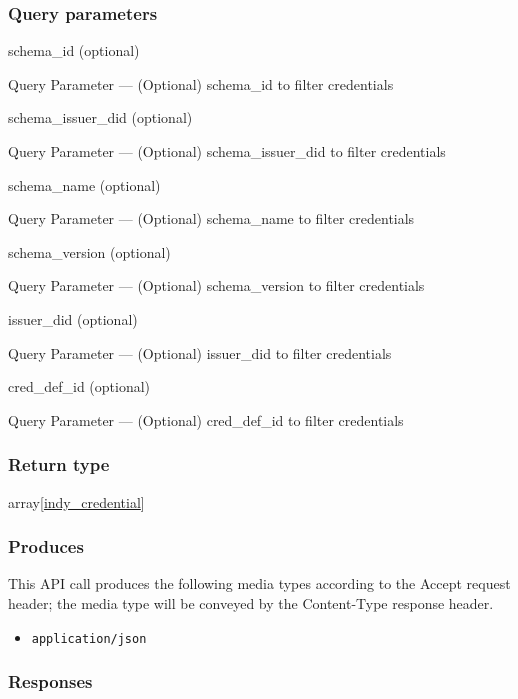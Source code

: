 \hypertarget{query-parameters-4}{%
\subsubsection{Query parameters}\label{query-parameters-4}}

schema\_id (optional)

{Query Parameter} --- (Optional) schema\_id to filter credentials

schema\_issuer\_did (optional)

{Query Parameter} --- (Optional) schema\_issuer\_did to filter
credentials

schema\_name (optional)

{Query Parameter} --- (Optional) schema\_name to filter credentials

schema\_version (optional)

{Query Parameter} --- (Optional) schema\_version to filter credentials

issuer\_did (optional)

{Query Parameter} --- (Optional) issuer\_did to filter credentials

cred\_def\_id (optional)

{Query Parameter} --- (Optional) cred\_def\_id to filter credentials

\hypertarget{return-type-105}{%
\subsubsection{Return type}\label{return-type-105}}

array{[}\protect\hyperlink{indy_credential}{indy\_credential}{]}

\hypertarget{produces-134}{%
\subsubsection{Produces}\label{produces-134}}

This API call produces the following media types according to the
{Accept} request header; the media type will be conveyed by the
{Content-Type} response header.

\begin{itemize}
\tightlist
\item
  \texttt{application/json}
\end{itemize}

\hypertarget{responses-137}{%
\subsubsection{Responses}\label{responses-137}}

